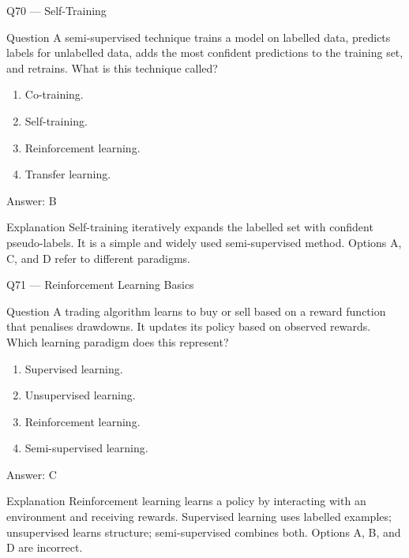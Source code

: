\documentclass[aspectratio=169,8pt]{beamer}
\begin{document}
	\begin{frame}{Q70 --- Self-Training}
		\begin{block}{Question}
			A semi-supervised technique trains a model on labelled data, predicts labels for unlabelled data, adds the most confident predictions to the training set, and retrains. What is this technique called?
		\end{block}
		\begin{enumerate}
			\item Co-training.
			\item Self-training.
			\item Reinforcement learning.
			\item Transfer learning.
		\end{enumerate}
		\begin{exampleblock}{Answer: B}\end{exampleblock}
		\begin{block}{Explanation}
			Self-training iteratively expands the labelled set with confident pseudo-labels. It is a simple and widely used semi-supervised method. Options A, C, and D refer to different paradigms.
		\end{block}
	\end{frame}
	
	\begin{frame}{Q71 --- Reinforcement Learning Basics}
		\begin{block}{Question}
			A trading algorithm learns to buy or sell based on a reward function that penalises drawdowns. It updates its policy based on observed rewards. Which learning paradigm does this represent?
		\end{block}
		\begin{enumerate}
			\item Supervised learning.
			\item Unsupervised learning.
			\item Reinforcement learning.
			\item Semi-supervised learning.
		\end{enumerate}
		\begin{exampleblock}{Answer: C}\end{exampleblock}
		\begin{block}{Explanation}
			Reinforcement learning learns a policy by interacting with an environment and receiving rewards. Supervised learning uses labelled examples; unsupervised learns structure; semi-supervised combines both. Options A, B, and D are incorrect.
		\end{block}
	\end{frame}
	
\end{document}
